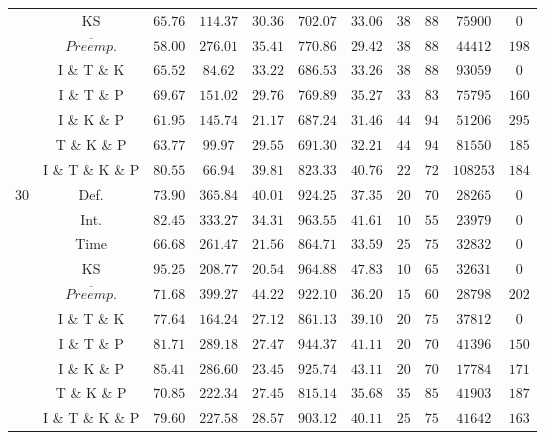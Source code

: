 \documentclass{article}
\begin{document}
{\begin{tabular}{|c|c|c|cc|cccccc|}
                             & KS & $65.76$ & $114.37$ & $30.36$ & $702.07$ & $33.06$ & $38$ & $88$ & $75900$ & $0 $ \\
                             & $\overline{Preemp.}$&$58.00$ & $276.01$ & $35.41$ & $770.86$ & $29.42$ & $38$ & $88$ & $44412$ & $198 $ \\ 
                             & I \& T \& K &$65.52$ & $84.62$ & $33.22$ & $686.53$ & $33.26$ & $38$ & $88$ & $93059$ & $0 $ \\ 
                             & I \& T \& P & $69.67$ & $151.02$ & $29.76$ & $769.89$ & $35.27$ & $33$ & $83$ & $75795$ & $160 $ \\
                             & I \& K \& P & $61.95$ & $145.74$ & $21.17$ & $687.24$ & $31.46$ & $44$ & $94$ & $51206$ & $295 $ \\ 
                             & T \& K \& P & $63.77$ & $99.97$ & $29.55$ & $691.30$ & $32.21$ & $44$ & $94$ & $81550$ & $185 $ \\ 
                             & I \& T \& K \& P & $80.55$ & $66.94$ & $39.81$ & $823.33$ & $40.76$ & $22$ & $72$ & $108253$ & $184 $ \\
    \hline
    \multirow{10}{*}{30} &  Def. & $73.90$ & $365.84$ & $40.01$ & $924.25$ & $37.35$ & $20$ & $70$ & $28265$ & $0 $ \\
                             & Int. & $82.45$ & $333.27$ & $34.31$ & $963.55$ & $41.61$ & $10$ & $55$ & $23979$ & $0 $ \\
                             & Time & $66.68$ & $261.47$ & $21.56$ & $864.71$ & $33.59$ & $25$ & $75$ & $32832$ & $0 $ \\ 
                             & KS & $95.25$ & $208.77$ & $20.54$ & $964.88$ & $47.83$ & $10$ & $65$ & $32631$ & $0 $ \\ 
                             & $\overline{Preemp.}$&$71.68$ & $399.27$ & $44.22$ & $922.10$ & $36.20$ & $15$ & $60$ & $28798$ & $202 $ \\ 
                             & I \& T \& K &$77.64$ & $164.24$ & $27.12$ & $861.13$ & $39.10$ & $20$ & $75$ & $37812$ & $0 $ \\ 
                             & I \& T \& P & $81.71$ & $289.18$ & $27.47$ & $944.37$ & $41.11$ & $20$ & $70$ & $41396$ & $150 $ \\ 
                             & I \& K \& P & $85.41$ & $286.60$ & $23.45$ & $925.74$ & $43.11$ & $20$ & $70$ & $17784$ & $171 $ \\ 
                             & T \& K \& P & $70.85$ & $222.34$ & $27.45$ & $815.14$ & $35.68$ & $35$ & $85$ & $41903$ & $187 $ \\ 
                             & I \& T \& K \& P & $79.60$ & $227.58$ & $28.57$ & $903.12$ & $40.11$ & $25$ & $75$ & $41642$ & $163 $ \\ 
    \hline
  \end{tabular}}
\end{document}
